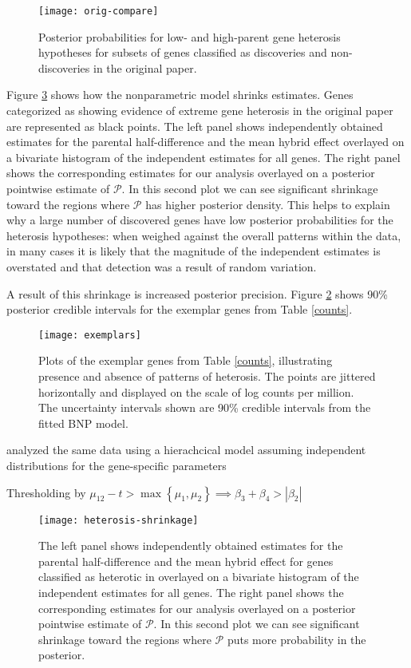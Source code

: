 \begin{figure}[h!]
\centering
\texttt{[image: orig-compare]}
\caption{Posterior probabilities for low- and high-parent gene heterosis hypotheses for subsets of genes classified as discoveries and non-discoveries in the original \citet{paschold} paper.}
\label{orig-compare}
\end{figure}

Figure \ref{het-shrink} shows how the nonparametric model shrinks estimates. Genes categorized as showing evidence of extreme gene heterosis in the original paper are represented as black points. The left panel shows independently obtained estimates for the parental half-difference and the mean hybrid effect overlayed on a bivariate histogram of the independent estimates for all genes. The right
panel shows the corresponding estimates for our analysis overlayed on a posterior pointwise estimate of $\mathcal{P}$. In this second plot we can see significant shrinkage toward the regions where $\mathcal{P}$ has higher posterior density. This helps to explain why a large number of discovered genes have low posterior probabilities for the heterosis hypotheses: when weighed against the overall patterns within the data, in many cases it is likely that the magnitude of the independent estimates is overstated and that detection was a result of random variation.

A result of this shrinkage is increased posterior precision. Figure \ref{exemplars} shows 90\% posterior credible intervals for the exemplar genes from Table \ref{counts}.

\begin{figure}[ht!]
\centering
\texttt{[image: exemplars]}
\caption{Plots of the exemplar genes from Table \ref{counts}, illustrating presence and absence of patterns of heterosis. The points are jittered horizontally and displayed on the scale of log counts per million. The uncertainty intervals shown are 90\% credible intervals from the fitted BNP model.}
\label{exemplars}
\end{figure}

\citet{landau2016high} analyzed the same data using a hierachcical model assuming independent distributions for the gene-specific parameters

Thresholding by $\mu_{12} - t > \max\left\{\mu_1,\mu_2\right\} \implies \beta_3+\beta_4 > |\beta_2|$

\begin{figure}[h!]
\centering
\texttt{[image: heterosis-shrinkage]}
\begin{minipage}{.8\textwidth}
\caption{\small The left panel shows independently obtained estimates for the parental half-difference and the mean hybrid effect for genes classified as heterotic in \citet{paschold} overlayed on a bivariate histogram of the independent estimates for all genes. The right
panel shows the corresponding estimates for our analysis overlayed on a posterior pointwise estimate of $\mathcal{P}$. In this second plot we can see significant shrinkage toward the regions where $\mathcal{P}$ puts more probability in the posterior.}
\end{minipage}
\label{het-shrink}
\end{figure}

